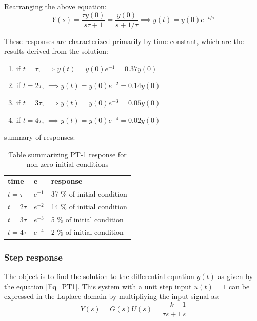 Rearranging the above equation:
\begin{equation} \label{Eq_PT1_nonzeroICResponse}
	Y(s) = \frac{\tau y(0)}{s \tau + 1} = \frac{y(0)}{s + 1/\tau} \implies y(t) = y(0) e^{-t/\tau}
\end{equation}

These responses are characterized primarily by time-constant, which are the results derived from the solution:

\begin{enumerate}
	\item if $t = \tau$, $\implies y(t) = y(0) e^{-1} = 0.37 y(0)$
	\item if $t = 2\tau$, $\implies y(t) = y(0) e^{-2} = 0.14 y(0)$
	\item if $t = 3 \tau$, $\implies y(t) = y(0) e^{-3} = 0.05 y(0)$
	\item if $t = 4 \tau$, $\implies y(t) = y(0) e^{-4} = 0.02 y(0)$
\end{enumerate}

summary of responses:

\begin{table}[h!]
	\begin{tabular}{m{4cm} m{4cm} m{6cm}}
		\toprule
		\textbf{time} & \textbf{e} & \textbf{response} \\
		\cmidrule{1-3}
		$t = \tau$ & $e^{-1}$ & 37 $\%$ of initial condition \\
		$t = 2 \tau$ & $e^{-2}$ & 14 $\%$ of initial condition \\
		$t = 3 \tau$ & $e^{-3}$ & 5 $\%$ of initial condition \\
		$t = 4 \tau$ & $e^{-4}$ & 2 $\%$ of initial condition \\
		\bottomrule
	\end{tabular}
	\caption{Table summarizing PT-1 response for non-zero initial conditions}
\end{table}

\subsubsection{Step response}

The object is to find the solution to the differential equation $y(t)$ as given by the equation \eqref{Eq_PT1}. This system with a unit step input $u(t) = 1$ can be expressed in the Laplace domain by multipliying the input signal as:
\begin{equation} \label{Eq_PT1_step}
Y(s) = G(s) U(s) = \frac{k}{\tau s + 1}\frac{1}{s}
\end{equation}

